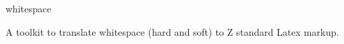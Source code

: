 \begin{zsection}
 \SECTION whitespace
\end{zsection}

A toolkit to translate whitespace (hard and soft) to Z standard Latex 
markup.

